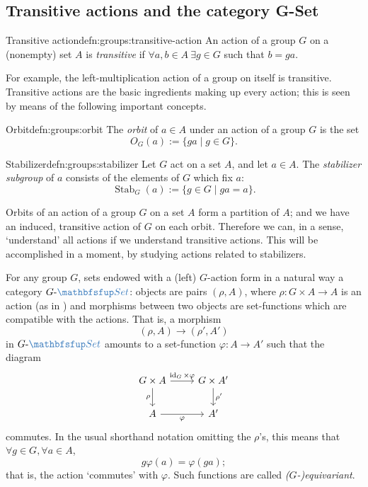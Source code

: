 \subsection{Transitive actions and the category G-Set}
\label{subsec:groups:transitive-actions-and-the-category-g-set}

\begin{defn}{Transitive action}{defn:groups:transitive-action}
  An action of a group $G$ on a (nonempty) set $A$ is
  \emph{transitive} if $\forall a, b \in A\ \exists g \in G$ such that
  $b = ga$.
\end{defn}

For example, the left-multiplication action of a group on itself is
transitive. Transitive actions are the basic ingredients making up
every action; this is seen by means of the following important
concepts.

\begin{defn}{Orbit}{defn:groups:orbit}
  The \emph{orbit} of $a \in A$ under an action of a group $G$ is the
  set
  \[
    O_G(a) := \{ga \mid g \in G\}.
  \]
\end{defn}

\begin{defn}{Stabilizer}{defn:groups:stabilizer}
  Let $G$ act on a set $A$, and let $a \in A$. The \emph{stabilizer
    subgroup} of $a$ consists of the elements of $G$ which fix $a$:
  \[
    \operatorname{Stab}_G(a) := \{g \in G \mid ga = a\}.
  \]
\end{defn}

Orbits of an action of a group $G$ on a set $A$ form a partition of
$A$; and we have an induced, transitive action of $G$ on each orbit.
Therefore we can, in a sense, `understand' all actions if we
understand transitive actions. This will be accomplished in a moment,
by studying actions related to stabilizers.

For any group $G$, sets endowed with a (left) $G$-action form in a
natural way a category $G\text{-}\categ{Set}$: objects are pairs
$(\rho, A)$, where $\rho : G \times A \to A$ is an action (as in
) and morphisms between
two objects are set-functions which are compatible with the actions.
That is, a morphism
\[
  (\rho, A) \to (\rho', A')
\]
in $G\text{-}\categ{Set}$ amounts to a set-function
$\varphi : A \to A'$ such that the diagram
\[
  \begin{tikzcd}
    G \times A \arrow[r, "\id_G \times \varphi"] \arrow[d, "\rho"'] &
    G \times A' \arrow[d, "\rho'"] \\
    A \arrow[r, "\varphi"'] & A'
  \end{tikzcd}
\]
commutes. In the usual shorthand notation omitting the $\rho$'s, this
means that $\forall g \in G, \forall a \in A$,
\[
  g\varphi(a) = \varphi(ga);
\]
that is, the action `commutes' with $\varphi$. Such functions are
called \emph{($G$-)equivariant}.

